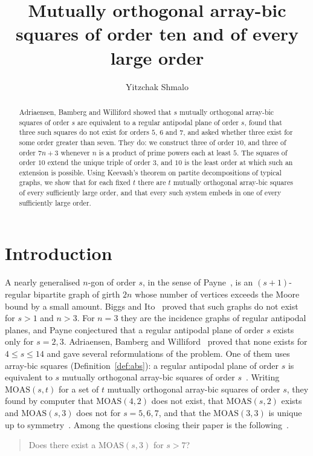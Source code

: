\documentclass[11pt]{amsart}
\title[Array-bic squares of order ten and of every large order]{Mutually orthogonal array-bic squares of order ten and of every large order}
\author{Yitzchak Shmalo}
\theoremstyle{definition}\newtheorem{definition}[theorem]{Definition}
\theoremstyle{remark}\newtheorem{remark}[theorem]{Remark}
\newcommand{\MOAS}{\mathrm{MOAS}}
\begin{document}
\begin{abstract}
Adriaensen, Bamberg and Williford showed that $s$ mutually orthogonal array-bic squares of order $s$ are equivalent
to a regular antipodal plane of order $s$, found that three such squares do not exist for orders $5$, $6$ and $7$,
and asked whether three exist for some order greater than seven. They do: we construct three of order $10$, and
three of order $7n+3$ whenever $n$ is a product of prime powers each at least $5$. The squares of order $10$ extend
the unique triple of order $3$, and $10$ is the least order at which such an extension is possible. Using Keevash's
theorem on partite decompositions of typical graphs, we show that for each fixed $t$ there are $t$ mutually
orthogonal array-bic squares of every sufficiently large order, and that every such system embeds in one of every
sufficiently large order.
\end{abstract}
\maketitle

\section{Introduction}\label{sec:intro}
A nearly generalised $n$-gon of order $s$, in the sense of Payne~\cite{Payne}, is an $(s+1)$-regular bipartite graph
of girth $2n$ whose number of vertices exceeds the Moore bound by a small amount. Biggs and Ito~\cite{BiggsIto} proved
that such graphs do not exist for $s>1$ and $n>3$. For $n=3$ they are the incidence graphs of regular antipodal planes,
and Payne conjectured that a regular antipodal plane of order $s$ exists only for $s=2,3$. Adriaensen, Bamberg and
Williford~\cite{ABW} proved that none exists for $4\le s\le14$ and gave several reformulations of the problem. One of them uses array-bic squares (Definition~\ref{def:abs}): a
regular antipodal plane of order $s$ is equivalent to $s$ mutually orthogonal array-bic squares of order
$s$~\cite[Proposition~2.20]{ABW}. Writing $\MOAS(s,t)$ for a set of $t$ mutually orthogonal array-bic squares of
order $s$, they found by computer that $\MOAS(4,2)$ does not exist, that $\MOAS(s,2)$ exists and $\MOAS(s,3)$ does
not for $s=5,6,7$, and that the $\MOAS(3,3)$ is unique up to symmetry~\cite[Section~2.4]{ABW}. Among the questions
closing their paper is the following~\cite[Section~3, (Q3)]{ABW}.

\begin{quote}
Does there exist a $\MOAS(s,3)$ for $s>7$?
\end{quote}
\end{document}
